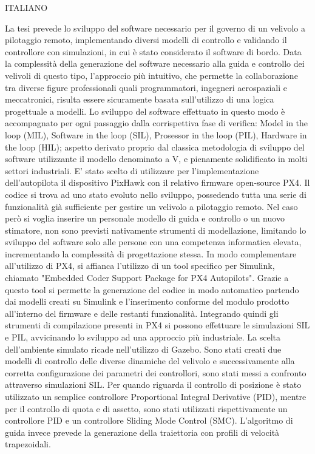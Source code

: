 \begin{commento}
ITALIANO


La tesi prevede lo sviluppo del software necessario per il governo di un velivolo a pilotaggio remoto, implementando diversi modelli di controllo e validando il controllore con simulazioni, in cui è stato considerato il software di bordo.
Data la complessità della generazione del software necessario alla guida e controllo dei velivoli di questo tipo, l'approccio più intuitivo, che permette la collaborazione tra diverse figure professionali quali programmatori, ingegneri aerospaziali e meccatronici, risulta essere sicuramente basata sull'utilizzo di una logica progettuale a modelli.
Lo sviluppo del software effettuato in questo modo è accompagnato per ogni passaggio dalla corrispettiva fase di verifica: Model in the loop (MIL), Software in the loop (SIL), Prosessor in the loop (PIL), Hardware in the loop (HIL); aspetto derivato proprio dal classica metodologia di sviluppo del software utilizzante il modello denominato a V, e pienamente solidificato in molti settori industriali.
E' stato scelto di utilizzare per l'implementazione dell'autopilota il dispositivo PixHawk con il relativo firmware open-source PX4. Il codice si trova ad uno stato evoluto nello sviluppo, possedendo tutta una serie di funzionalità già sufficiente per gestire un velivolo a pilotaggio remoto. Nel caso però si voglia inserire un personale modello di guida e controllo o un nuovo stimatore, non sono previsti nativamente strumenti di modellazione, limitando lo sviluppo del software solo alle persone con una competenza informatica elevata, incrementando la complessità di progettazione stessa.
In modo complementare all'utilizzo di PX4, si affianca l'utilizzo di un tool specifico per Simulink, chiamato "Embedded Coder Support Package
for PX4 Autopilots". Grazie a questo tool si permette la generazione del codice in modo automatico partendo dai modelli creati su Simulink e l'inserimento conforme del modulo prodotto all'interno del firmware e delle restanti funzionalità. Integrando quindi gli strumenti di compilazione presenti in PX4 si possono effettuare le simulazioni SIL e PIL, avvicinando lo sviluppo ad una approccio più industriale.
La scelta dell'ambiente simulato ricade nell'utilizzo di Gazebo.
Sono stati creati due modelli di controllo delle diverse dinamiche del velivolo e successivamente alla corretta configurazione dei parametri dei controllori, sono stati messi a confronto attraverso simulazioni SIL. Per quando riguarda il controllo di posizione è stato utilizzato un semplice controllore Proportional Integral Derivative (PID), mentre per il controllo di quota e di assetto, sono stati utilizzati rispettivamente un controllore PID e un controllore Sliding Mode Control (SMC). L'algoritmo di guida invece prevede la generazione della traiettoria con profili di velocità trapezoidali.

\end{commento}
